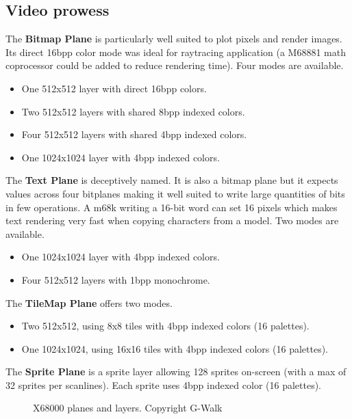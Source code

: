 \subsection{Video prowess}

The \textbf{Bitmap Plane} is particularly well suited to plot pixels and render images. Its direct 16bpp color mode was ideal for raytracing application (a M68881 math coprocessor could be added to reduce rendering time). Four modes are available.


\begin{itemize}[topsep=0pt]
\item One 512x512 layer with direct 16bpp colors.
\item Two 512x512 layers with shared 8bpp indexed colors.
\item Four 512x512 layers with shared 4bpp indexed colors.
\item One 1024x1024 layer with 4bpp indexed colors.
\end{itemize}

The \textbf{Text Plane} is deceptively named. It is also a bitmap plane but it expects values across four bitplanes making it well suited to write large quantities of bits in few operations. A m68k writing a 16-bit word can set 16 pixels which makes text rendering very fast when copying characters from a model. Two modes are available.

\begin{itemize}[topsep=0pt]
\item One 1024x1024 layer with 4bpp indexed colors.
\item Four 512x512 layers with 1bpp monochrome.
\end{itemize}


The \textbf{TileMap Plane} offers two modes.
\begin{itemize}[topsep=0pt]
\item Two 512x512, using 8x8 tiles with 4bpp indexed colors (16 palettes).
\item One 1024x1024, using 16x16 tiles with 4bpp indexed colors (16 palettes).
\end{itemize}

The \textbf{Sprite Plane} is a sprite layer allowing 128 sprites on-screen (with a max of 32 sprites per scanlines). Each sprite uses 4bpp indexed color (16 palettes).


 \begin{figure}[H]
\caption*{X68000 planes and layers. Copyright G-Walk\cite{x68k_perfect_catalogue}}
\end{figure}



